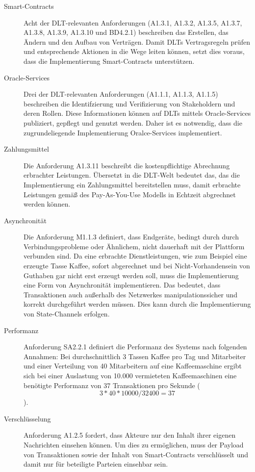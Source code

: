 \begin{description}
  \item[Smart-Contracts] Acht der \ac{DLT}-relevanten Anforderungen (A1.3.1, A1.3.2, A1.3.5, A1.3.7, A1.3.8, A1.3.9, A1.3.10 und BD4.2.1) beschreiben das Erstellen, das Ändern und den Aufbau von Verträgen. Damit \ac{DLT}s Vertragsregeln prüfen und entsprechende Aktionen in die Wege leiten können, setzt dies voraus, dass die Implementierung Smart-Contracts unterstützen.
  \item[Oracle-Services] Drei der \ac{DLT}-relevanten Anforderungen (A1.1.1, A1.1.3, A1.1.5) beschreiben die Identifzierung und Verifizierung von Stakeholdern und deren Rollen. Diese Informationen können auf \ac{DLT}s mittels Oracle-Services publiziert, gepflegt und genutzt werden. Daher ist es notwendig, dass die zugrundeliegende Implementierung Oralce-Services implementiert.
  \item[Zahlungsmittel] Die Anforderung A1.3.11 beschreibt die kostenpflichtige Abrechnung erbrachter Leistungen. Übersetzt in die \ac{DLT}-Welt bedeutet das, das die Implementierung ein Zahlungsmittel bereitstellen muss, damit erbrachte Leistungen gemäß des Pay-As-You-Use Modells in Echtzeit abgrechnet werden können.
  \item[Asynchronität] Die Anforderung M1.1.3 definiert, dass Endgeräte, bedingt durch durch Verbindungsprobleme oder Ähnlichem, nicht dauerhaft mit der Plattform verbunden sind. Da eine erbrachte Dienstleistungen, wie zum Beispiel eine erzeugte Tasse Kaffee, sofort abgerechnet und bei Nicht-Vorhandensein von Guthaben gar nicht erst erzeugt werden soll, muss die Implementierung eine Form von Asynchronität implementieren. Das bedeutet, dass Transaktionen auch außerhalb des Netzwerkes manipulationssicher und korrekt durchgeführt werden müssen. Dies kann durch die Implementierung von State-Channels erfolgen.
  \item[Performanz] Anforderung SA2.2.1 definiert die Performanz des Systems nach folgenden Annahmen: Bei durchschnittlich 3 Tassen Kaffee pro Tag und Mitarbeiter und einer Verteilung von 40 Mitarbeitern auf eine Kaffeemaschine ergibt sich bei einer Auslastung von 10.000 vermieteten Kaffeemaschinen eine benötigte Performanz von 37 Transaktionen pro Sekunde ($$ 3*40*10000/32400=37 $$).
  \item[Verschlüsselung] Anforderung A1.2.5 fordert, dass Akteure nur den Inhalt ihrer eigenen Nachrichten einsehen können. Um dies zu ermöglichen, muss der Payload von Transaktionen sowie der Inhalt von Smart-Contracts verschlüsselt und damit nur für beteiligte Parteien einsehbar sein.
\end{description}
